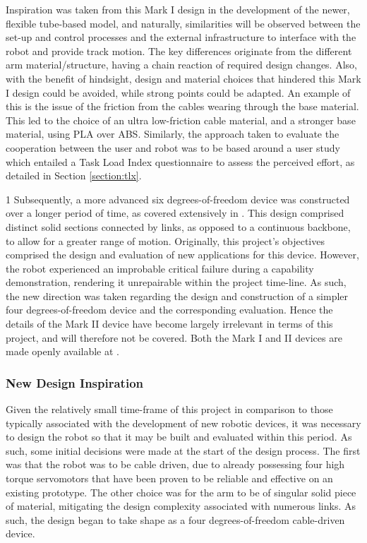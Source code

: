 \documentclass[11pt]{article}
\begin{document}
Inspiration was taken from this Mark I design in the development of the newer, flexible tube-based model, and naturally, similarities will be observed between the set-up and control processes and the external infrastructure to interface with the robot and provide track motion. The key differences originate from the different arm material/structure, having a chain reaction of required design changes. Also, with the benefit of hindsight, design and material choices that hindered this Mark I design could be avoided, while strong points could be adapted. An example of this is the issue of the friction from the cables wearing through the base material. This led to the choice of an ultra low-friction cable material, and a stronger base material, using PLA over ABS. Similarly, the approach taken to evaluate the cooperation between the user and robot was to be based around a user study which entailed a Task Load Index questionnaire to assess the perceived effort, as detailed in Section \ref{section:tlx}.

1
Subsequently, a more advanced six degrees-of-freedom device was constructed over a longer period of time, as covered extensively in \cite{GreggSmithKinematics}. This design comprised distinct solid sections connected by links, as opposed to a continuous backbone, to allow for a greater range of motion. Originally, this project's objectives comprised the design and evaluation of new applications for this device. However, the robot experienced an improbable critical failure during a capability demonstration, rendering it unrepairable within the project time-line. As such, the new direction was taken regarding the design and construction of a simpler four degrees-of-freedom device and the corresponding evaluation. Hence the details of the Mark II device have become largely irrelevant in terms of this project, and will therefore not be covered. Both the Mark I and II devices are made openly available at \cite{handheldrobotics}.

\subsubsection{New Design Inspiration}
\label{section:newDesignInspiration}
Given the relatively small time-frame of this project in comparison to those typically associated with the development of new robotic devices, it was necessary to design the robot so that it may be built and evaluated within this period. As such, some initial decisions were made at the start of the design process. The first was that the robot was to be cable driven, due to already possessing four high torque servomotors that have been proven to be reliable and effective on an existing prototype. The other choice was for the arm to be of singular solid piece of material, mitigating the design complexity associated with numerous links. As such, the design began to take shape as a four degrees-of-freedom cable-driven device. 
\end{document}
